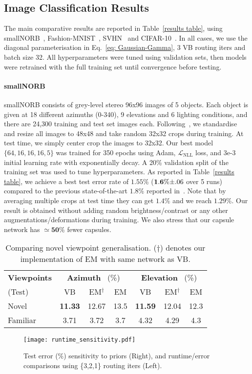 \documentclass[letterpaper]{article} \usepackage{aaai20}  \usepackage{times}  \usepackage{helvet} \usepackage{courier}  \usepackage[hyphens]{url}  \usepackage{graphicx} \urlstyle{rm} \def\UrlFont{\rm}  \usepackage{graphicx}  \frenchspacing  \setlength{\pdfpagewidth}{8.5in}  \setlength{\pdfpageheight}{11in}  \nocopyright
\begin{document}
\subsection{Image Classification Results}
\label{results_section}
The main comparative results are reported in Table~\ref{results table}, using smallNORB~\cite{lecun2004learning}, Fashion-MNIST~\cite{xiao2017fashion}, SVHN~\cite{netzer2011reading} and CIFAR-10~\cite{krizhevsky2009learning}. In all cases, we use the diagonal parameterisation in Eq.~\eqref{eq: Gaussian-Gamma}, 3 VB routing iters and batch size 32. All hyperparameters were tuned using validation sets, then models were retrained with the full training set until convergence before testing.
\paragraph{smallNORB} 
smallNORB consists of grey-level stereo 96x96 images of 5 objects. Each object is given at 18 different azimuths (0-340), 9 elevations and 6 lighting conditions, and there are 24,300 training and test set images each. Following~\cite{hinton2018matrix}, we standardise and resize all images to 48x48 and take random 32x32 crops during training. At test time, we simply center crop the images to 32x32. Our best model $\{64, 16, 16, 16, 5\}$ was trained for 350 epochs using Adam, $\mathcal{L}_{\mathrm{NLL}}$ loss, and 3e-3 initial learning rate with exponentially decay. A 20\% validation split of the training set was used to tune hyperparameters. As reported in Table~\ref{results table}, we achieve a best test error rate of $\mathbf{1.55}$\% ($\mathbf{1.6}\%\scriptsize{\pm.06}$ over 5 runs) compared to the previous state-of-the-art $\mathbf{1.8}$\% reported in~\cite{hinton2018matrix}. Note that by averaging multiple crops at test time they can get $\mathbf{1.4}$\% and we reach $\mathbf{1.29}$\%. Our result is obtained without adding random brightness/contrast or any other augmentations/deformations during training. We also stress that our capsule network has $\simeq\textbf{50}\%$ fewer capsules. 
\begin{table}[t]
\footnotesize
\centering
\caption{Comparing novel viewpoint generalisation. ($\dagger$) denotes our implementation of EM with same network as VB.}
\label{viewpoints}
\begin{tabular}{lccc|ccc}
\toprule  
\textbf{Viewpoints} & \multicolumn{3}{c}{\textbf{Azimuth} \ (\%)} & 
\multicolumn{3}{c}{\textbf{Elevation} \ (\%)} \\
(Test) & VB & EM$^{\dagger}$ & EM & VB & EM$^{\dagger}$ & EM \\
\midrule
Novel & \textbf{11.33} & 12.67 & 13.5 & \textbf{11.59} & 12.04 & 12.3 \\  Familiar & 3.71 & 3.72 & 3.7 & 4.32 & 4.29 & 4.3 \\ 
\bottomrule
\end{tabular}
\end{table}
\begin{figure}[t]
    \centering
	\texttt{[image: runtime\_sensitivity.pdf]}
	\caption{Test error (\%) sensitivity to priors (Right), and runtime/error comparisons using \{3,2,1\} routing iters (Left).}
	\label{runtime_sensitivity}
\end{figure}
\end{document}

